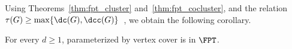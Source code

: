 %
%
%



Using Theorems~\ref{thm:fpt_cluster} and~\ref{thm:fpt_cocluster}, and the relation $\tau(G) \geq \max\{\dc(G), \dcc(G)\}$~\cite{matching_cut_ipec}, we obtain the following corollary. %

\begin{corollary}
    For every $d \geq 1$,  parameterized by vertex cover is in $\FPT$.
\end{corollary}
